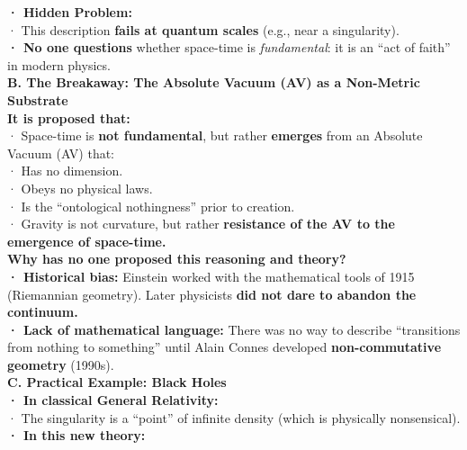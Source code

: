 \documentclass[a4paper]{article}
\theoremstyle{definition}
\theoremstyle{remark}
\numberwithin{equation}{section}
\begin{document}
\textbf{· Hidden Problem:}\\

· This description \textbf{fails at quantum scales} (e.g., near a singularity).\\

\textbf{· No one questions} whether space-time is \textit{fundamental}: it is an “act of faith” in modern physics.\\

\textbf{B. The Breakaway: The Absolute Vacuum (AV) as a Non-Metric Substrate}\\

\textbf{It is proposed that:}\\

· Space-time is \textbf{not fundamental}, but rather \textbf{emerges} from an Absolute Vacuum (AV) that:\\

· Has no dimension.\\

· Obeys no physical laws.\\

· Is the “ontological nothingness” prior to creation.\\

· Gravity is not curvature, but rather \textbf{resistance of the AV to the emergence of space-time.}\\

\textbf{Why has no one proposed this reasoning and theory? \cite{Smolin2006}}\\

\textbf{· Historical bias:} Einstein worked with the mathematical tools of 1915 (Riemannian geometry). Later physicists \textbf{did not dare to abandon the continuum.}\\

\textbf{· Lack of mathematical language:} There was no way to describe ``transitions from nothing to something'' until Alain Connes \cite{Connes} developed \textbf{non-commutative geometry} (1990s).\\

\textbf{C. Practical Example: Black Holes}\\

\textbf{· In classical General Relativity:}\\

· The singularity is a ``point'' of infinite density (which is physically nonsensical).\\

\textbf{· In this new theory:}\\
\end{document}
